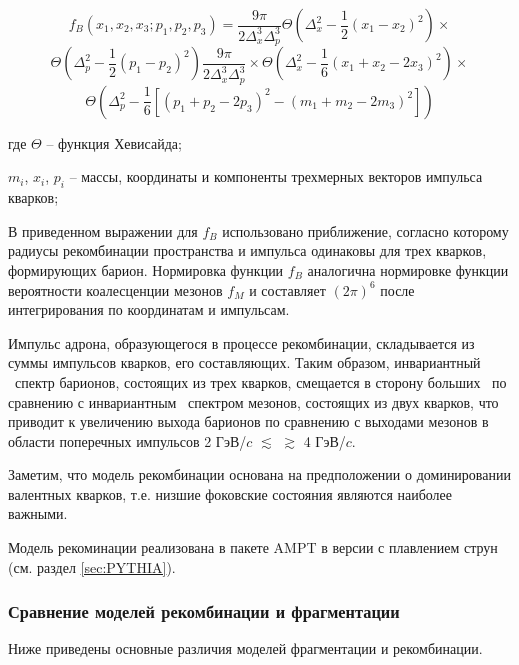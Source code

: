 $$f_B(x_1, x_2, x_3; p_1, p_2, p_3) = \frac{9 \pi}{2\Delta_{x}^3 \Delta_{p}^3} 
\Theta \left( \Delta_{x}^2 - \frac{1}{2} (x_1 - x_2)^2\right) \times $$
$$\Theta \left( \Delta_{p}^2 - \frac{1}{2} (p_1 - p_2)^2\right) \frac{9 \pi}{2\Delta_{x}^3 \Delta_{p}^3}\times
\Theta \left( \Delta_{x}^2 - \frac{1}{6} (x_1 + x_2 - 2 x_3)^2\right) \times $$
$$\Theta \left( \Delta_{p}^2 - \frac{1}{6} \left[ (p_1 + p_2 - 2 p_3)^2 - (m_1 + m_2 -2 m_3)^2 \right] \right) $$

где $\Theta$ -- функция Хевисайда;

$m_i$, $x_i$, $p_i$ -- массы, координаты и компоненты трехмерных векторов импульса кварков;


В приведенном выражении для $f_B$ использовано приближение, согласно которому радиусы рекомбинации пространства и импульса одинаковы для трех кварков, формирующих барион. Нормировка функции $f_B$ аналогична нормировке функции вероятности коалесценции мезонов $f_M$ и составляет $(2\pi)^6$ после интегрирования по координатам и импульсам. 

Импульс адрона, образующегося в процессе рекомбинации, складывается из суммы импульсов кварков, его составляющих. Таким образом, инвариантный \pt \ спектр барионов, состоящих из трех кварков, смещается в сторону больших \pT \ по сравнению с инвариантным \pT \ спектром мезонов, состоящих из двух кварков, что приводит к увеличению выхода барионов по сравнению с выходами мезонов в области поперечных импульсов 2 ГэВ/$c$ $\lesssim$ \pT $\gtrsim$ 4 ГэВ/$c$. 

Заметим, что модель рекомбинации основана на предположении о доминировании валентных кварков, т.е. низшие фоковские состояния являются наиболее важными. 

Модель рекоминации реализована в пакете AMPT в версии с плавлением струн \cite{AMPT} (см. раздел \ref{sec:PYTHIA}). 


\subsubsection{Сравнение моделей рекомбинации и фрагментации}
Ниже приведены основные различия моделей фрагментации и рекомбинации. 

